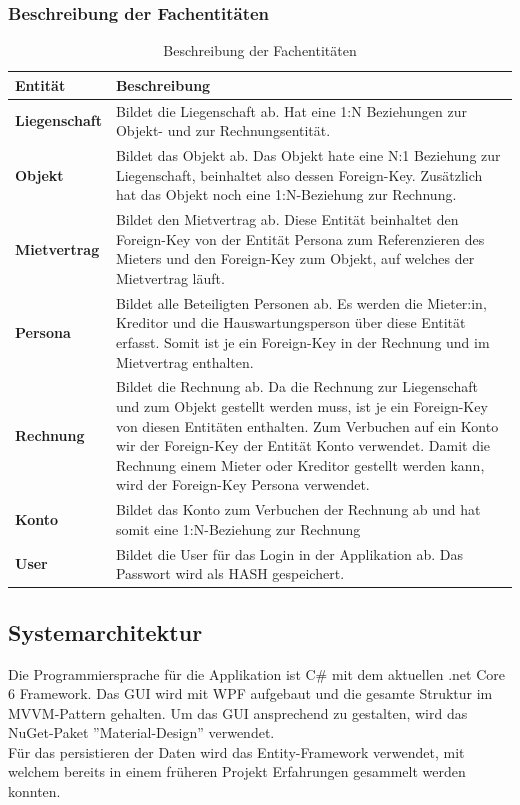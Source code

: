 \subsubsection{Beschreibung der Fachentitäten}
\begin{table}[H]
  \centering
  \settowidth{}
  \setlength\extrarowheight{2pt}
    \begin{tabulary}{1.0\textwidth}{|L|m{15cm}|}
      \hline
      \textbf{Entität}& \textbf{Beschreibung}\\
    \hline
    \textbf{Liegenschaft} & Bildet die Liegenschaft ab. Hat eine 1:N Beziehungen zur Objekt- und zur Rechnungsentität.\\
    \hline
    \textbf{Objekt} & Bildet das Objekt ab. Das Objekt hate eine N:1 Beziehung zur Liegenschaft, beinhaltet also dessen Foreign-Key. Zusätzlich hat das Objekt noch eine 1:N-Beziehung zur Rechnung.\\
    \hline
    \textbf{Mietvertrag} & Bildet den Mietvertrag ab. Diese Entität beinhaltet den Foreign-Key von der Entität Persona zum Referenzieren des Mieters und den Foreign-Key zum Objekt, auf welches der Mietvertrag läuft. \\
    \hline
    \textbf{Persona} & Bildet alle Beteiligten Personen ab. Es werden die Mieter:in, Kreditor und die Hauswartungsperson über diese Entität erfasst. Somit ist je ein Foreign-Key in der Rechnung und im Mietvertrag enthalten. \\
    \hline
    \textbf{Rechnung} & Bildet die Rechnung ab. Da die Rechnung zur Liegenschaft und zum Objekt gestellt werden muss, ist je ein Foreign-Key von diesen Entitäten enthalten. Zum Verbuchen auf ein Konto wir der Foreign-Key der Entität Konto verwendet. Damit die Rechnung einem Mieter oder Kreditor gestellt werden kann, wird der Foreign-Key Persona verwendet.\\
    \hline
    \textbf{Konto} & Bildet das Konto zum Verbuchen der Rechnung ab und hat somit eine 1:N-Beziehung zur Rechnung\\
    \hline
    \textbf{User} & Bildet die User für das Login in der Applikation ab. Das Passwort wird als HASH gespeichert.\\
    \hline 
\end{tabulary}
\caption{Beschreibung der Fachentitäten}
\end{table}

\subsection{Systemarchitektur}
Die Programmiersprache für die Applikation ist C\# mit dem aktuellen .net Core 6 Framework. Das GUI wird mit WPF aufgebaut und die gesamte Struktur im MVVM-Pattern gehalten. Um das GUI ansprechend zu gestalten, wird das NuGet-Paket ''Material-Design'' verwendet.\\
Für das persistieren der Daten wird das Entity-Framework verwendet, mit welchem bereits in einem früheren Projekt Erfahrungen gesammelt werden konnten.
